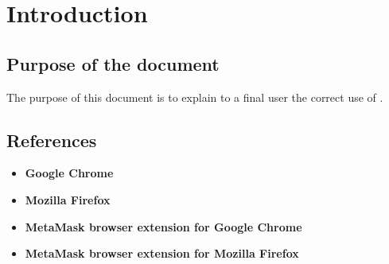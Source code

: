 \documentclass[ManualeUtente]{subfiles}
\begin{document}
\chapter{Introduction}

	\section{Purpose of the document}
	The purpose of this document is to explain to a final user the correct use of \progetto.
	
	\scopoProdottoEN
	
	
	\section{References}
		\begin{itemize}
			\item \textbf{Google Chrome}\\
			\item \textbf{Mozilla Firefox}\\
			\item \textbf{MetaMask browser extension for Google Chrome}\\
			\item \textbf{MetaMask browser extension for Mozilla Firefox}\\
		\end{itemize}
\end{document}
